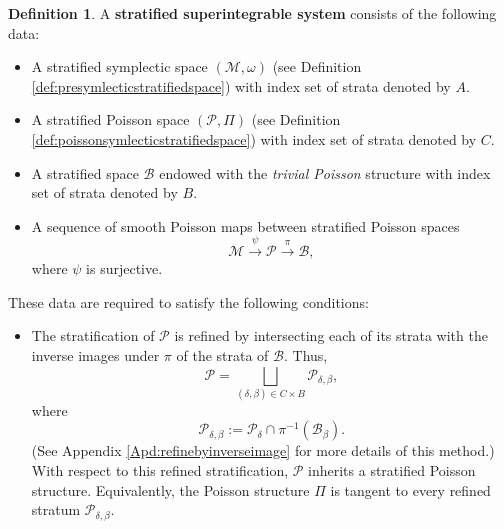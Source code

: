 \documentclass[12pt]{amsart}
\theoremstyle{definition}
\newtheorem{definition}[theorem]{Definition}
\numberwithin{equation}{section}
\begin{document}
 
 \begin{definition}\label{Def:stratifiedsuperintNEW}
 A \textbf{stratified superintegrable system} consists of the following data:
\begin{itemize}
    \item[(1)~] A stratified symplectic space $(\mathcal{M},\omega)$ (see Definition \ref{def:presymlecticstratifiedspace}) with index set of strata denoted by $A$.

    \item[(2)~] A stratified Poisson space $(\mathcal{P},\Pi)$ (see Definition \ref{def:poissonsymlecticstratifiedspace})  with index set of strata denoted by $C$.

    \item[(3)~] A stratified space $\mathcal{B}$ endowed with the \textit{trivial Poisson} structure  with index set of strata denoted by $B$.

    \item[(4)~] A sequence of smooth Poisson maps between stratified Poisson spaces 
    \begin{equation}\label{NEWSeq:generalMPBstratified}
        \mathcal{M} \overset{\psi}{\longrightarrow} \mathcal{P}
        \overset{\pi}{\longrightarrow} \mathcal{B},
    \end{equation}
    where $\psi$ is surjective.
\end{itemize}

These data are required to satisfy the following conditions:
\begin{itemize}
    \item[(5)~] The stratification of $\mathcal{P}$ is refined by intersecting each of its strata with the inverse images under $\pi$ of the strata of $\mathcal{B}$. Thus,
    \[
        \mathcal{P}
        = \bigsqcup_{(\delta,\beta)\in C\times B}
        \mathcal{P}_{\delta,\beta},
    \]
    where
    \[
        \mathcal{P}_{\delta,\beta}
        := \mathcal{P}_{\delta}\cap \pi^{-1}(\mathcal{B}_{\beta}).
    \](See Appendix \ref{Apd:refinebyinverseimage} for more details of this method.) 
   With respect to this refined stratification, $\mathcal{P}$ inherits a stratified Poisson structure. Equivalently, the Poisson structure $\Pi$ is tangent to every refined stratum $\mathcal{P}_{\delta,\beta}$.


\end{itemize}
\end{definition}
\end{document}
